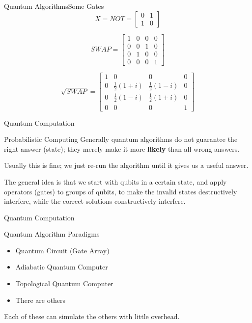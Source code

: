 \documentclass[12pt]{beamer}
\begin{document}
\begin{frame}{Quantum Algorithms}{Some Gates}
	\[ X = NOT = \left[ \begin{array}{cc} 0 & 1 \\ 1 & 0 \end{array} \right] \]
	
	\[ SWAP = \left[ \begin{array}{cccc}
		1 & 0 & 0 & 0 \\
		0 & 0 & 1 & 0 \\
		0 & 1 & 0 & 0 \\
		0 & 0 & 0 & 1
	\end{array} \right] \]

	\[ \sqrt{SWAP} = \left[ \begin{array}{cccc}
		1 & 0 & 0 & 0 \\
		0 & \frac{1}{2}(1+i) & \frac{1}{2}(1-i) & 0 \\
		0 & \frac{1}{2}(1-i) & \frac{1}{2}(1+i) & 0 \\
		0 & 0 & 0 & 1
	\end{array} \right] \]
\end{frame}

\begin{frame}{Quantum Computation}
	\begin{block}{Probabilistic Computing}
		Generally quantum algorithms do not guarantee the right answer (state); they
		merely make it more \textbf{likely} than all wrong answers.

		Usually this is fine; we just re-run the algorithm until it gives us a
		useful answer.
	\end{block}

	\begin{block}{}
		The general idea is that we start with qubits in a certain state, and
		apply operators (gates) to groups of qubits, to make the invalid states
		destructively interfere, while the correct solutions constructively
		interfere.
	\end{block}
\end{frame}

\begin{frame}{Quantum Computation}
	\begin{block}{Quantum Algorithm Paradigms}
		\begin{itemize}
			\item Quantum Circuit (Gate Array)
			\item Adiabatic Quantum Computer
			\item Topological Quantum Computer
			\item There are others
		\end{itemize}
	\end{block}
	Each of these can simulate the others with little overhead.
\end{frame}
\end{document}
